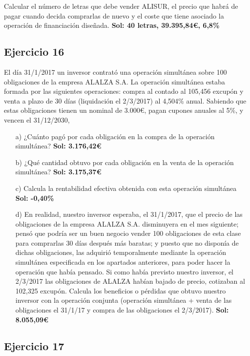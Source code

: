 Calcular el número de letras que debe vender ALISUR, el precio que habrá de pagar cuando decida comprarlas de nuevo y el coste que tiene asociado la operación de financiación diseñada. \textbf{Sol: 40 letras, 39.395,84€, 6,8\%}

\subsection*{Ejercicio 16}

El día 31/1/2017 un inversor contrató una operación simultánea sobre 100 obligaciones de la empresa ALALZA S.A. La operación simultánea estaba formada por las siguientes operaciones: compra al contado al 105,456 excupón y venta a plazo de 30 días (liquidación el 2/3/2017) al 4,504\% anual. Sabiendo que estas obligaciones tienen un nominal de 3.000€, pagan cupones anuales al 5\%, y vencen el 31/12/2030,

\begin{enumerate}
    \item[a)] ¿Cuánto pagó por cada obligación en la compra de la operación simultánea? \textbf{Sol: 3.176,42€}
    \item[b)] ¿Qué cantidad obtuvo por cada obligación en la venta de la operación simultánea? \textbf{Sol: 3.175,37€}
    \item[c)] Calcula la rentabilidad efectiva obtenida con esta operación simultánea \textbf{Sol: -0,40\%}
    \item[d)] En realidad, nuestro inversor esperaba, el 31/1/2017, que el precio de las obligaciones de la empresa ALALZA S.A. disminuyera en el mes siguiente; pensó que podría ser un buen negocio vender 100 obligaciones de esta clase para comprarlas 30 días después más baratas; y puesto que no disponía de dichas obligaciones, las adquirió temporalmente mediante la operación simultánea especificada en los apartados anteriores, para poder hacer la operación que había pensado. Si como había previsto nuestro inversor, el 2/3/2017 las obligaciones de ALALZA habían bajado de precio, cotizaban al 102,325 excupón. Calcula los beneficios o pérdidas que obtuvo nuestro inversor con la operación conjunta (operación simultánea + venta de las obligaciones el 31/1/17 y compra de las obligaciones el 2/3/2017). \textbf{Sol: 8.055,09€}
\end{enumerate}

\subsection*{Ejercicio 17}

